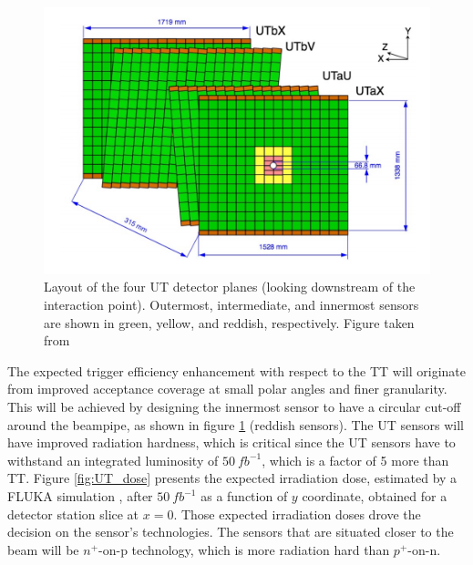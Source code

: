  \begin{figure}[!h]
\centering
\includegraphics{figures/UT.png}
\caption{Layout of the four UT detector planes (looking downstream of the interaction point). Outermost, intermediate, and innermost sensors are shown in green, yellow, and reddish, respectively. Figure taken from \cite{upgrade_tracker_tdr}
\label{fig:UT_scheme}}
\end{figure}


The expected trigger efficiency enhancement with respect to the TT will originate from improved acceptance coverage at small polar angles and finer granularity.  This will be achieved by designing the innermost sensor to have a circular cut-off around the beampipe, as shown in figure \ref{fig:UT_scheme} (reddish sensors). The UT sensors will have improved radiation hardness, which is critical since the UT sensors have to withstand an integrated luminosity of $50~ fb^{-1}$, which is a factor of 5 more than TT.  Figure \ref{fig:UT_dose} presents  the expected irradiation dose, estimated by a FLUKA simulation \cite{fluka}, after $50~ fb^{-1}$ as a function of $y$ coordinate, obtained for a detector station slice at $x=0$. Those expected irradiation doses drove the decision on the sensor's technologies. The sensors that are situated closer to the beam will be $n^{+}\text{-on-p}$ technology, which is more radiation hard than $p^{+}\text{-on-n}$.  
 
